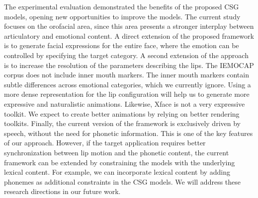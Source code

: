 \documentclass[10pt,journal,compsoc]{IEEEtran}
\begin{document}
The experimental evaluation demonstrated the benefits of the proposed CSG models, opening new opportunities to improve the models. The current study focuses on the orofacial area, since this area presents a stronger interplay between articulatory and emotional content. A direct extension of the proposed framework is to generate facial expressions for the entire face, where the emotion can be controlled by specifying the target category. A second extension of the approach is to increase the resolution of the parameters describing the lips. The IEMOCAP corpus does not include inner mouth markers. The inner mouth markers contain subtle differences across emotional categories, which we currently ignore. Using a more dense representation for the lip configuration will help us to generate more expressive and naturalistic animations. Likewise, Xface is not a very expressive toolkit. We expect to create better animations by relying on better rendering toolkits. Finally, the current version of the framework is exclusively driven by speech, without the need for phonetic information. This is one of the key features of our approach. However, if the target application requires better synchronization between lip motion and the phonetic content, the current framework can be extended by constraining the models with the underlying lexical content. For example, we can incorporate lexical content by adding phonemes as additional constraints in the CSG models. We will address these research directions in our future work.  








%
%
%
\end{document}
